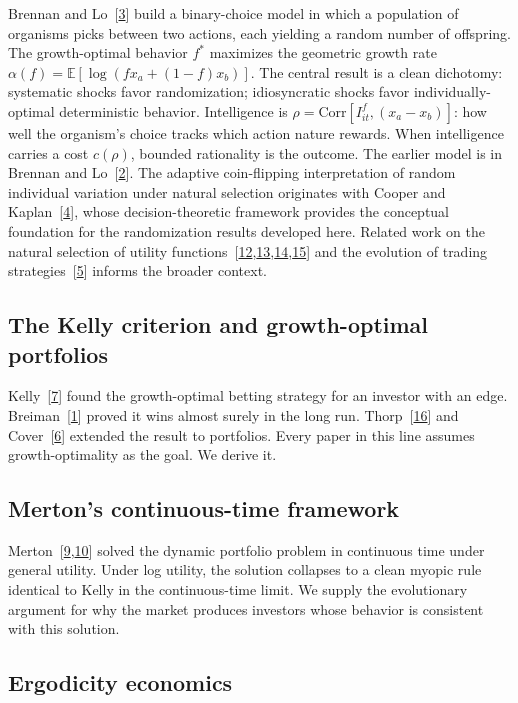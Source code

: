\documentclass[11pt]{article}
\newcommand{\E}{\mathbb{E}}
\newcommand{\Corr}{\mathrm{Corr}}
\begin{document}
Brennan and Lo~[\hyperlink{ref:3}{3}] build a binary-choice model in which a population
of organisms picks between two actions, each yielding a random number
of offspring. The growth-optimal behavior $f^{*}$ maximizes the
geometric growth rate $\alpha(f) = \E[\log(f x_{a} + (1-f)x_{b})]$.
The central result is a clean dichotomy: systematic shocks favor
randomization; idiosyncratic shocks favor individually-optimal
deterministic behavior. Intelligence is $\rho = \Corr[I^{f}_{it},
(x_{a} - x_{b})]$: how well the organism's choice tracks which
action nature rewards. When intelligence carries a cost $c(\rho)$,
bounded rationality is the outcome. The earlier model is in Brennan
and Lo~[\hyperlink{ref:2}{2}]. The adaptive coin-flipping interpretation of random
individual variation under natural selection originates with Cooper
and Kaplan~[\hyperlink{ref:4}{4}], whose decision-theoretic framework provides the
conceptual foundation for the randomization results developed here.
Related work on the natural selection of utility
functions~[\hyperlink{ref:12}{12},\hyperlink{ref:13}{13},\hyperlink{ref:14}{14},\hyperlink{ref:15}{15}] and the evolution of trading
strategies~[\hyperlink{ref:5}{5}] informs the broader context.

\subsection{The Kelly criterion and growth-optimal portfolios}

Kelly~[\hyperlink{ref:7}{7}] found the growth-optimal betting strategy for an investor
with an edge. Breiman~[\hyperlink{ref:1}{1}] proved it wins almost surely in the long
run. Thorp~[\hyperlink{ref:16}{16}] and Cover~[\hyperlink{ref:6}{6}] extended the result to portfolios.
Every paper in this line assumes growth-optimality as the goal. We
derive it.

\subsection{Merton's continuous-time framework}

Merton~[\hyperlink{ref:9}{9},\hyperlink{ref:10}{10}] solved the dynamic portfolio problem in continuous
time under general utility. Under log utility, the solution collapses
to a clean myopic rule identical to Kelly in the continuous-time
limit. We supply the evolutionary argument for why the market
produces investors whose behavior is consistent with this solution.

\subsection{Ergodicity economics}
\end{document}
